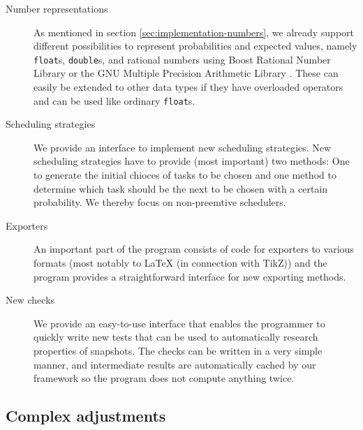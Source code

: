 \begin{description}
\item[Number representations] As mentioned in section \ref{sec:implementation-numbers}, we already support different possibilities to represent probabilities and expected values, namely \texttt{float}s, \texttt{double}s, and rational numbers using Boost Rational Number Library \cite{boostrational} or the GNU Multiple Precision Arithmetic Library \cite{gnumultiprecision}. These can easily be extended to other data types if they have overloaded operators and can be used like ordinary \texttt{float}s.
\item[Scheduling strategies] We provide an interface to implement new scheduling strategies. New scheduling strategies have to provide (most important) two methods: One to generate the initial chioces of tasks to be chosen and one method to determine which task should be the next to be chosen with a certain probability. We thereby focus on non-preemtive schedulers.
\item[Exporters] An important part of the program consists of code for exporters to various formats (most notably to \LaTeX{} (in connection with TikZ)) and the program provides a straightforward interface for new exporting methods.
\item[New checks] We provide an easy-to-use interface that enables the programmer to quickly write new tests that can be used to automatically research properties of snapshots. The checks can be written in a very simple manner, and intermediate results are automatically cached by our framework so the program does not compute anything twice.
\end{description}

\subsection{Complex adjustments}
\label{sec:implementations-extensions-moderate}

